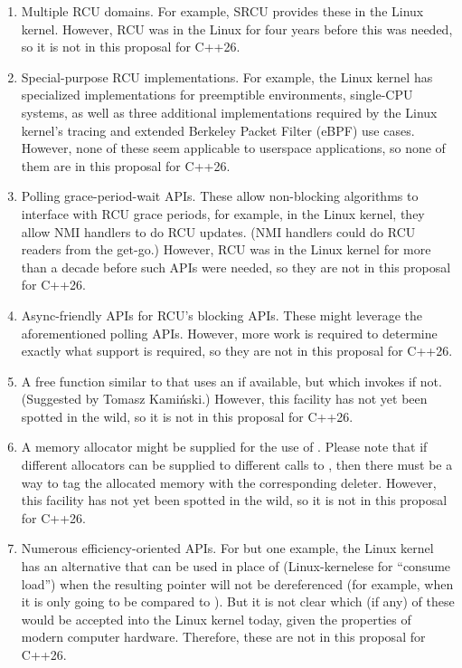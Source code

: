 \begin{enumerate}
\item	Multiple RCU domains.
	For example, SRCU provides these in the Linux kernel.
	However, RCU was in the Linux for four years before
	this was needed, so it is not in this proposal for C++26.
\item	Special-purpose RCU implementations.
	For example, the Linux kernel has specialized implementations
	for preemptible environments, single-CPU systems,
	as well as three additional implementations required by
	the Linux kernel's tracing and extended Berkeley Packet
	Filter (eBPF) use cases.
	However, none of these seem applicable to userspace applications,
	so none of them are in this proposal for C++26.
\item	Polling grace-period-wait APIs.
	These allow non-blocking algorithms to interface with RCU
	grace periods, for example, in the Linux kernel, they allow
	NMI handlers to do RCU updates.
	(NMI handlers could do RCU readers from the get-go.)
	However, RCU was in the Linux kernel for more than a decade before
	such APIs were needed, so they are not in this proposal for C++26.
\item	Async-friendly APIs for RCU's blocking APIs.
	These might leverage the aforementioned polling APIs.
	However, more work is required to determine exactly what support
	is required, so they are not in this proposal for C++26.
\item	A free function similar to  that uses
	an  if available, but which invokes
	 if not.
	(Suggested by Tomasz Kami\'{n}ski.)
	However, this facility has not yet been spotted in the wild,
	so it is not in this proposal for C++26.
\item	A memory allocator might be supplied for the use of
	.
	Please note that if different allocators can be supplied to
	different calls to , then there must be a way
	to tag the allocated memory with the corresponding deleter.
	However, this facility has not yet been spotted in the wild,
	so it is not in this proposal for C++26.
\item	Numerous efficiency-oriented APIs.
	For but one example, the Linux kernel has an alternative
	 that can be used in place
	of  (Linux-kernelese for ``consume load'')
	when the resulting pointer will not be dereferenced
	(for example, when it is only going to be compared to ).
	But it is not clear which (if any) of these would be accepted
	into the Linux kernel today, given the properties of modern
	computer hardware.
	Therefore, these are not in this proposal for C++26.
\end{enumerate}

